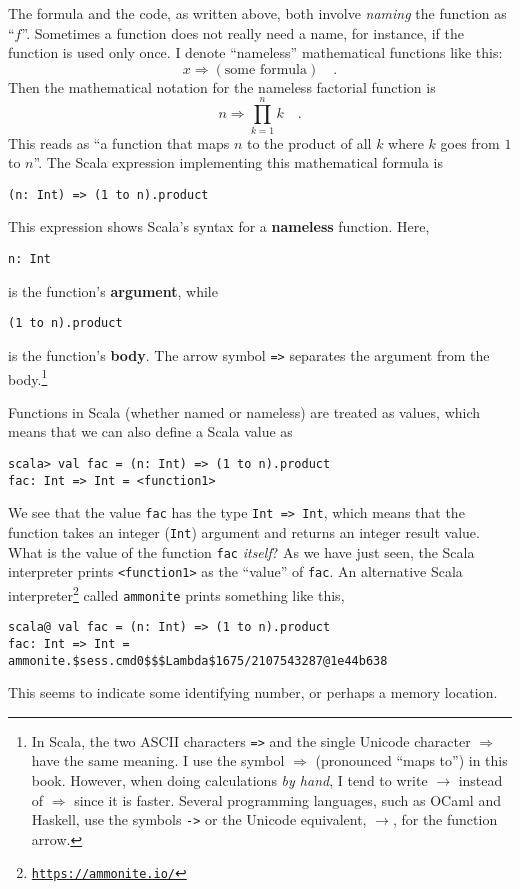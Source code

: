 The formula and the code, as written above, both involve \emph{naming}
the function as ``$f$''. Sometimes a function does not really need
a name, \textendash{} for instance, if the function is used only once.
I denote ``nameless'' mathematical functions like this: 
\[
x\Rightarrow\left(\text{some formula}\right)\quad.
\]
Then the mathematical notation for the nameless factorial function
is
\[
n\Rightarrow\prod_{k=1}^{n}k\quad.
\]
This reads as ``a function that maps $n$ to the product of all $k$
where $k$ goes from $1$ to $n$''. The Scala expression implementing
this mathematical formula is
\begin{lstlisting}
(n: Int) => (1 to n).product
\end{lstlisting}
This expression shows Scala's syntax for a \textbf{nameless}
function. Here, 
\begin{lstlisting}
n: Int
\end{lstlisting}
is the function's \textbf{argument}, while
\begin{lstlisting}
(1 to n).product
\end{lstlisting}
is the function's \textbf{body}. The arrow symbol \lstinline!=>!
separates the argument from the body.\footnote{In Scala, the two ASCII characters \lstinline!=>! and the single
Unicode character $\Rightarrow$ have the same meaning. I use the
symbol $\Rightarrow$ (pronounced ``maps to'') in this book. However,
when doing calculations \emph{by hand}, I tend to write $\rightarrow$
instead of $\Rightarrow$ since it is faster. Several programming
languages, such as OCaml and Haskell, use the symbols \lstinline!->!
or the Unicode equivalent, $\rightarrow$, for the function arrow.} 

Functions in Scala (whether named or nameless) are treated as values,
which means that we can also define a Scala value as
\begin{lstlisting}
scala> val fac = (n: Int) => (1 to n).product
fac: Int => Int = <function1>
\end{lstlisting}
We see that the value \lstinline!fac! has the type \lstinline!Int => Int!,
which means that the function takes an integer (\lstinline!Int!)
argument and returns an integer result value. What is the value of
the function \lstinline!fac! \emph{itself}? As we have just seen,
the Scala interpreter prints \lstinline!<function1>! as the ``value''
of \lstinline!fac!. An alternative Scala interpreter\footnote{\texttt{\href{https://ammonite.io/}{https://ammonite.io/}}}
called \texttt{ammonite} prints something like this,
\begin{lstlisting}
scala@ val fac = (n: Int) => (1 to n).product
fac: Int => Int = ammonite.$sess.cmd0$$$Lambda$1675/2107543287@1e44b638
\end{lstlisting}
This seems to indicate some identifying number, or perhaps a memory
location.

